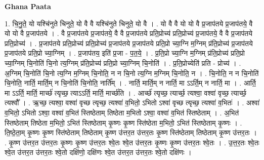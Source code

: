 \documentclass[17pt]{extarticle}
\begin{document}
\textbf{Ghana Paata } \newline

1. चि॒नु॒ते॒ यो यश्चि॑नुते चिनुते॒ यो वै वै यश्चि॑नुते चिनुते॒ यो वै । . यो वै वै यो यो वै प्र॒जाप॑तये प्र॒जाप॑तये॒ वै यो यो वै प्र॒जाप॑तये । . वै प्र॒जाप॑तये प्र॒जाप॑तये॒ वै वै प्र॒जाप॑तये प्रति॒प्रोच्य॑ प्रति॒प्रोच्य॑ प्र॒जाप॑तये॒ वै वै प्र॒जाप॑तये प्रति॒प्रोच्य॑ । . प्र॒जाप॑तये प्रति॒प्रोच्य॑ प्रति॒प्रोच्य॑ प्र॒जाप॑तये प्र॒जाप॑तये प्रति॒प्रो च्या॒ग्नि म॒ग्निम् प्र॑ति॒प्रोच्य॑ प्र॒जाप॑तये प्र॒जाप॑तये प्रति॒प्रो च्या॒ग्निम् । . प्र॒जाप॑तय॒ इति॑ प्र॒जा - प॒त॒ये॒ । . प्र॒ति॒प्रो च्या॒ग्नि म॒ग्निम् प्र॑ति॒प्रोच्य॑ प्रति॒प्रो च्या॒ग्निम् चि॒नोति॑ चि॒नो त्य॒ग्निम् प्र॑ति॒प्रोच्य॑ प्रति॒प्रो च्या॒ग्निम् चि॒नोति॑ । . प्र॒ति॒प्रोच्येति॑ प्रति - प्रोच्य॑ । . अ॒ग्निम् चि॒नोति॑ चि॒नो त्य॒ग्नि म॒ग्निम् चि॒नोति॒ न न चि॒नो त्य॒ग्नि म॒ग्निम् चि॒नोति॒ न । . चि॒नोति॒ न न चि॒नोति॑ चि॒नोति॒ नार्ति॒ मार्ति॒म् न चि॒नोति॑ चि॒नोति॒ नार्ति᳚म् । . नार्ति॒ मार्ति॒म् न नार्ति॒ मा ऽऽर्ति॒म् न नार्ति॒ मा । . आर्ति॒ मा ऽऽर्ति॒ मार्ति॒ मार्च्छ॑ त्यृच्छ॒ त्याऽऽर्ति॒ मार्ति॒ मार्च्छ॑ति । . आर्च्छ॑ त्यृच्छ॒ त्यार्च्छ॒ त्यश्वा॒ वश्वा॑ वृच्छ॒ त्यार्च्छ॒ त्यश्वौ᳚ । . ऋ॒च्छ॒ त्यश्वा॒ वश्वा॑ वृच्छ त्यृच्छ॒ त्यश्वा॑ व॒भितो॒ ऽभितो ऽश्वा॑ वृच्छ त्यृच्छ॒ त्यश्वा॑ व॒भितः॑ । . अश्वा॑ व॒भितो॒ ऽभितो ऽश्वा॒ वश्वा॑ व॒भित॑ स्तिष्ठेताम् तिष्ठेता म॒भितो ऽश्वा॒ वश्वा॑ व॒भित॑ स्तिष्ठेताम् । . अ॒भित॑ स्तिष्ठेताम् तिष्ठेता म॒भितो॒ ऽभित॑ स्तिष्ठेताम् कृ॒ष्णः कृ॒ष्ण स्ति॑ष्ठेता म॒भितो॒ ऽभित॑ स्तिष्ठेताम् कृ॒ष्णः । . ति॒ष्ठे॒ता॒म् कृ॒ष्णः कृ॒ष्ण स्ति॑ष्ठेताम् तिष्ठेताम् कृ॒ष्ण उ॑त्तर॒त उ॑त्तर॒तः कृ॒ष्ण स्ति॑ष्ठेताम् तिष्ठेताम् कृ॒ष्ण उ॑त्तर॒तः । . कृ॒ष्ण उ॑त्तर॒त उ॑त्तर॒तः कृ॒ष्णः कृ॒ष्ण उ॑त्तर॒तः श्वे॒तः श्वे॒त उ॑त्तर॒तः कृ॒ष्णः कृ॒ष्ण उ॑त्तर॒तः श्वे॒तः । . उ॒त्त॒र॒तः श्वे॒तः श्वे॒त उ॑त्तर॒त उ॑त्तर॒तः श्वे॒तो दक्षि॑णो॒ दक्षि॑णः श्वे॒त उ॑त्तर॒त उ॑त्तर॒तः श्वे॒तो दक्षि॑णः । \newline
\end{document}
